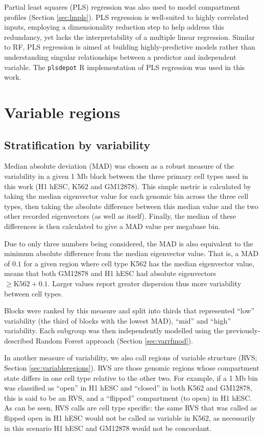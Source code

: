 \documentclass[a4paper,11pt,oneside]{book}
\begin{document}
Partial least squares (PLS) regression was also used to model compartment profiles (Section \ref{sec:lmpls}). PLS regression is well-suited to highly correlated inputs, employing a dimensionality reduction step to help address this redundancy, yet lacks the interpretability of a multiple linear regression. Similar to RF, PLS regression is aimed at building highly-predictive models rather than understanding singular relationships between a predictor and independent variable.\cite{Tobias1995} The \texttt{plsdepot} R implementation of PLS regression was used in this work.\cite{plsdepot}


\section{Variable regions}\label{variable-regions}

\subsection{Stratification by variability}\label{sec:variable}

Median absolute deviation (MAD) was chosen as a robust measure of the
variability in a given 1 Mb block between the three primary cell types
used in this work (H1 hESC, K562 and GM12878). This simple metric is calculated by taking the median eigenvector value for each genomic bin across the three cell types, then taking the absolute difference between this median value and the two other recorded eigenvectors (as well as itself). Finally, the median of these differences is then calculated to give a MAD value per megabase bin. 

Due to only three numbers being considered, the MAD is also equivalent to the minimum absolute difference from the median eigenvector value. That is, a MAD of $0.1$ for a given region where cell type K562 has the median eigenvector value, means that both GM12878 and H1 hESC had absolute eigenvectors $\geq \textrm{K562} + 0.1$. Larger values report greater dispersion thus more variability between cell types.

Blocks were ranked by this
measure and split into thirds that represented ``low'' variability (the
third of blocks with the lowest MAD), ``mid'' and ``high'' variability.
Each subgroup was then independently modelled using the
previously-described Random Forest approach (Section \ref{sec:varrfmod}).

In another measure of variability, we also call regions of variable structure (RVS; Section \ref{sec:variableregions}).
RVS are those genomic regions whose compartment state differs in one
cell type relative to the other two. For example, if a 1 Mb bin was
classified as ``open'' in H1 hESC and ``closed'' in both K562 and
GM12878, this is said to be an RVS, and a ``flipped'' compartment (to open) in H1 hESC. As can be seen, RVS calls are cell type specific: the same RVS that was called as flipped open in H1 hESC would not be called as variable in K562, as necessarily in this scenario H1 hESC and GM12878 would not be concordant.
\end{document}

